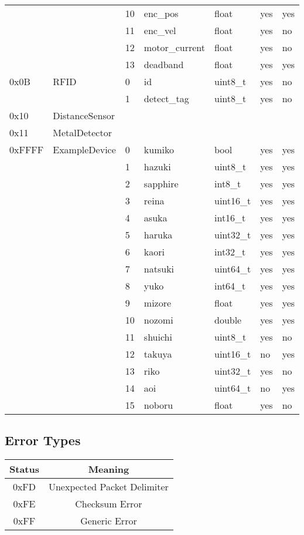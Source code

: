\documentclass[12pt]{book}
\begin{document}
\begin{longtable}[c]{@{}|l|l|l|l|l|l|l|@{}}
& & 10 & enc\_pos & float & yes & yes\tabularnewline
& & 11 & enc\_vel & float & yes & no\tabularnewline
& & 12 & motor\_current & float & yes & no\tabularnewline
& & 13 & deadband & float & yes & yes\tabularnewline
0x0B & RFID & 0 & id & uint8\_t & yes & no\tabularnewline
& & 1 & detect\_tag & uint8\_t & yes & no\tabularnewline
0x10 & DistanceSensor & & & & &\tabularnewline
0x11 & MetalDetector & & & & &\tabularnewline
0xFFFF & ExampleDevice & 0 & kumiko & bool & yes & yes\tabularnewline
& & 1 & hazuki & uint8\_t & yes & yes\tabularnewline
& & 2 & sapphire & int8\_t & yes & yes\tabularnewline
& & 3 & reina & uint16\_t & yes & yes\tabularnewline
& & 4 & asuka & int16\_t & yes & yes\tabularnewline
& & 5 & haruka & uint32\_t & yes & yes\tabularnewline
& & 6 & kaori & int32\_t & yes & yes\tabularnewline
& & 7 & natsuki & uint64\_t & yes & yes\tabularnewline
& & 8 & yuko & int64\_t & yes & yes\tabularnewline
& & 9 & mizore & float & yes & yes\tabularnewline
& & 10 & nozomi & double & yes & yes\tabularnewline
& & 11 & shuichi & uint8\_t & yes & no\tabularnewline
& & 12 & takuya & uint16\_t & no & yes\tabularnewline
& & 13 & riko & uint32\_t & yes & no\tabularnewline
& & 14 & aoi & uint64\_t & no & yes\tabularnewline
& & 15 & noboru & float & yes & no\tabularnewline
\bottomrule
\end{longtable}

\subsection{Error Types}
\begin{tabular}{|c|c|}
    \hline
    Status & Meaning \\
    \hline
    0xFD & Unexpected Packet Delimiter \\
    0xFE & Checksum Error \\
    0xFF & Generic Error \\
    \hline
\end{tabular}
\end{document}
